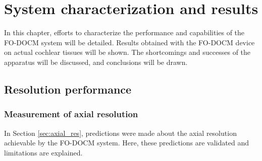 \chapter{System characterization and results}

In this chapter, efforts to characterize the performance and capabilities of the FO-DOCM system will be detailed. Results obtained with the FO-DOCM device on actual cochlear tissues will be shown. The shortcomings and successes of the apparatus will be discussed, and conclusions will be drawn.

\section{Resolution performance}

\subsection{Measurement of axial resolution}

In Section \ref{sec:axial_res}, predictions were made about the axial resolution achievable by the FO-DOCM system. Here, these predictions are validated and limitations are explained.






